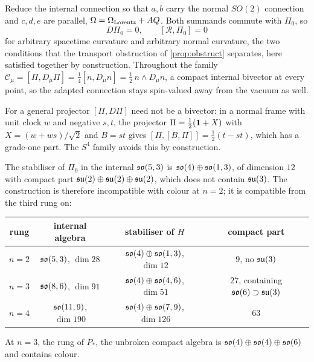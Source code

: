 \begin{theorem}
\label{thm:towercurved}
Reduce the internal connection so that $a,b$ carry the normal $SO(2)$ connection and $c,d,e$ are parallel, $\Omega=\Omega_{\rm Lorentz}+AQ$. Both summands commute with
$\Pi_0$, so
\[
D\Pi_0=0,\qquad [\mathcal R,\Pi_0]=0
\]
for arbitrary spacetime curvature and arbitrary normal curvature, the two conditions that the transport obstruction of \cref{prop:obstruct} separates, here satisfied
together by construction. Throughout the family $\mathcal C_\mu=[\Pi,D_\mu\Pi]=\tfrac14[n,D_\mu n]=\tfrac12\,n\wedge D_\mu n$, a compact internal bivector at every point, so the
adapted connection stays spin-valued away from the vacuum as well.
\end{theorem}

For a general projector $[\Pi,D\Pi]$ need not be a bivector: in a normal frame with unit clock $w$ and negative $s,t$, the projector $\Pi=\tfrac12(\mathbf 1+X)$ with $X=(w+ws)/\sqrt2$
and $B=st$ gives $[\Pi,[B,\Pi]]=\tfrac12(t-st)$, which has a grade-one part. The $S^4$ family avoids this by construction.

\begin{proposition}
\label{prop:towermatter}
The stabiliser of $\Pi_0$ in the internal $\mathfrak{so}(5,3)$ is $\mathfrak{so}(4)\oplus\mathfrak{so}(1,3)$, of dimension $12$ with compact part $\mathfrak{su}(2)\oplus\mathfrak{su}(2)\oplus\mathfrak{su}(2)$, which does not contain $\mathfrak{su}(3)$. The
construction is therefore incompatible with colour at $n=2$; it is compatible from the third rung on:
\begin{center}
\small
\begin{tabular}{@{}cccc@{}}
\toprule
rung & internal algebra & stabiliser of $H$ & compact part\\
\midrule
$n=2$ & $\mathfrak{so}(5,3)$, $\dim28$ & $\mathfrak{so}(4)\oplus\mathfrak{so}(1,3)$, $\dim12$ & $9$, no $\mathfrak{su}(3)$\\
$n=3$ & $\mathfrak{so}(8,6)$, $\dim91$ & $\mathfrak{so}(4)\oplus\mathfrak{so}(4,6)$, $\dim51$ & $27$, containing $\mathfrak{so}(6)\supset\mathfrak{su}(3)$\\
$n=4$ & $\mathfrak{so}(11,9)$, $\dim190$ & $\mathfrak{so}(4)\oplus\mathfrak{so}(7,9)$, $\dim126$ & $63$\\
\bottomrule
\end{tabular}
\end{center}
At $n=3$, the rung of $P_*$, the unbroken compact algebra is $\mathfrak{so}(4)\oplus\mathfrak{so}(4)\oplus\mathfrak{so}(6)$ and contains colour.
\end{proposition}

